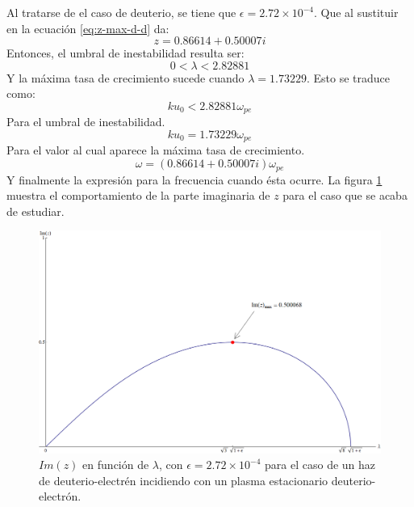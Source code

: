\documentclass[12pt]{article}
\begin{document}
Al tratarse de el caso de deuterio, se tiene que $\epsilon = 2.72 \times 10^{-4}$. Que al sustituir en la ecuación \ref{eq:z-max-d-d} da:
\begin{equation}
z=0.86614 + 0.50007i
\end{equation}
Entonces, el umbral de inestabilidad resulta ser:
\begin{equation}
0 < \lambda < 2.82881
\end{equation}
Y la máxima tasa de crecimiento sucede cuando $\lambda = 1.73229$.
Esto se traduce como:
\begin{equation}
ku_0 < 2.82881 \omega_{pe}
\end{equation}
Para el umbral de inestabilidad.
\begin{equation}
ku_0 = 1.73229 \omega_{pe}
\end{equation}
Para el valor al cual aparece la máxima tasa de crecimiento.
\begin{equation}
\omega = (0.86614 + 0.50007i)\omega_{pe}
\end{equation}
Y finalmente la expresión para la frecuencia cuando ésta ocurre. La figura \ref{fig:d-d} muestra el comportamiento de la parte imaginaria de $z$ para el caso que se acaba de estudiar.
\begin{figure}
\includegraphics[height=0.3\paperheight]{grafica-d-d-reposo}
\caption{$Im(z)$ en función de $\lambda$, con $\epsilon = 2.72 \times 10^{-4}$ para el caso de un haz de deuterio-electrén incidiendo con un plasma estacionario deuterio-electrón.}
\label{fig:d-d}
\end{figure}
\end{document}
